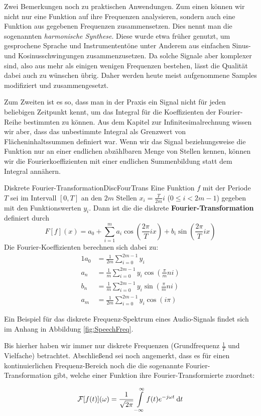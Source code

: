 Zwei Bemerkungen noch zu praktischen Anwendungen. Zum einen können wir nicht nur eine Funktion auf ihre Frequenzen analysieren, sondern auch eine Funktion aus gegebenen Frequenzen zusammensetzen. Dies nennt man die sogenannten \emph{harmonische Synthese}. Diese wurde etwa früher genutzt, um gesprochene Sprache und Instrumententöne unter Anderem aus einfachen Sinus- und Kosinusschwingungen zusammenzusetzen. Da solche Signale aber komplexer sind, also aus mehr als einigen wenigen Frequenzen bestehen, lässt die Qualität dabei auch zu wünschen übrig. Daher werden heute meist aufgenommene Samples modifiziert und zusammengesetzt.

Zum Zweiten ist es so, dass man in der Praxis ein Signal nicht für jeden beliebigen Zeitpunkt kennt, um das Integral für die Koeffizienten der Fourier-Reihe bestimmten zu können. Aus dem Kapitel zur Infinitesimalrechnung wissen wir aber, dass das unbestimmte Integral als Grenzwert von Flächeninhaltssummen definiert war. Wenn wir das Signal beziehungsweise die Funktion nur an einer endlichen abzählbaren Menge von Stellen kennen, können wir die Fourierkoeffizienten mit einer endlichen Summenbildung statt dem Integral annähern.

\begin{definition}{Diskrete Fourier-Transformation}{DiscFourTrans}
    Eine Funktion $f$ mit der Periode $T$ sei im Intervall $[0, T]$ an den $2m$ Stellen $x_i = \frac{T}{2m} i$ ($0\le i < 2m-1$) gegeben mit den Funktionswerten $y_i$. Dann ist die die diskrete \textbf{Fourier-Transformation} definiert durch
    $$
        F[f](x) = a_0 + \sum\limits_{i=1}^m a_i \cos(\frac{2\pi}{T}ix) + b_i \sin(\frac{2\pi}{T}ix)
    $$
    Die Fourier-Koeffizienten berechnen sich dabei zu:
    \begin{alignat*}{1}
        a_0 &= \frac{1}{2m} \sum\limits_{i=0}^{2m-1} y_i  \\
        a_n &= \frac{1}{m} \sum\limits_{i=0}^{2m-1} y_i \cos(\frac{\pi}{m} ni) \\
        b_n &= \frac{1}{m} \sum\limits_{i=0}^{2m-1} y_i \sin(\frac{\pi}{m} ni) \\
        a_m &= \frac{1}{2m} \sum\limits_{i=0}^{2m-1} y_i \cos(i\pi)
    \end{alignat*}
\end{definition}

Ein Beispiel für das diskrete Frequenz-Spektrum eines Audio-Signals findet sich im Anhang in Abbildung \ref{fig:SpeechFreq}.

Bis hierher haben wir immer nur diskrete Frequenzen (Grundfrequenz $\frac{1}{T}$ und Vielfache) betrachtet. Abschließend sei noch angemerkt, dass es für einen kontinuierlichen Frequenz-Bereich noch die die sogenannte Fourier-Transformation gibt, welche einer Funktion ihre Fourier-Transformierte zuordnet:

$$
    \mathcal{F}[f(t)](\omega) = \frac{1}{\sqrt{2\pi}} \int\limits_{-\infty}^\infty f(t) e^{-j \omega t} \:\mathrm{d}{t}
$$